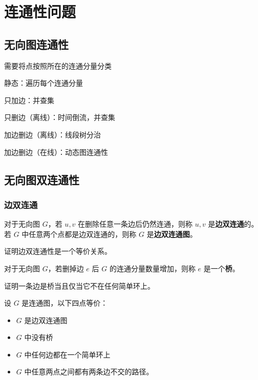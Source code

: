 \chapter{连通性问题}


\section{无向图连通性}

需要将点按照所在的连通分量分类

静态：遍历每个连通分量

只加边：并查集

只删边（离线）：时间倒流，并查集

加边删边（离线）：线段树分治

加边删边（在线）：动态图连通性

\section{无向图双连通性}

\subsection{边双连通}

\begin{definition}[边双连通性]
    对于无向图 $G$，若 $u,v$ 在删除任意一条边后仍然连通，则称 $u,v$ 是\textbf{边双连通}的。若 $G$ 中任意两个点都是边双连通的，则称 $G$ 是\textbf{边双连通图}。
\end{definition}
\begin{exercise}
    证明边双连通性是一个等价关系。
\end{exercise}
\begin{definition}[桥]
    对于无向图 $G$，若删掉边 $e$ 后 $G$ 的连通分量数量增加，则称 $e$ 是一个\textbf{桥}。
\end{definition}
\begin{exercise}
    证明一条边是桥当且仅当它不在任何简单环上。
\end{exercise}

\begin{lemma}[边双连通的刻画]
    设 $G$ 是连通图，以下四点等价：
\begin{itemize}
    \item $G$ 是边双连通图
    \item $G$ 中没有桥
    \item $G$ 中任何边都在一个简单环上
    \item $G$ 中任意两点之间都有两条边不交的路径。
\end{itemize}
\end{lemma}


